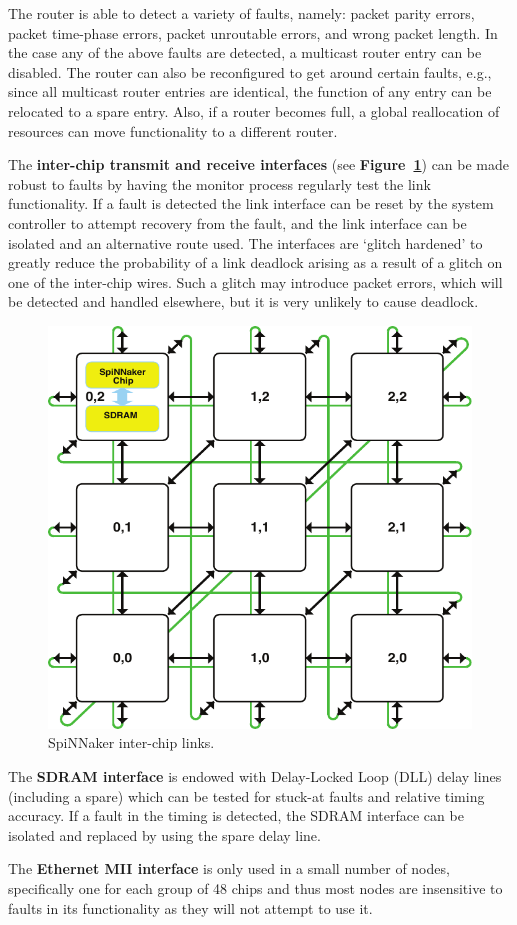 \documentclass[oneside, a4paper, 11pt]{memoir}
\begin{document}
The router is able to detect a variety of faults, namely: packet parity errors, packet time-phase errors, packet unroutable errors, and wrong packet length. In the case any of the above faults are detected, a multicast router entry can be disabled. The router can also be reconfigured to get around certain faults, e.g., since all multicast router entries are identical, the function of any entry can be relocated to a spare entry. Also, if a router becomes full, a global reallocation of resources can move functionality to a different router.

The \textbf{inter-chip transmit and receive interfaces} (see \textbf{Figure~\ref{fig:interchip_links}}) can be made robust to faults by having the monitor process regularly test the link functionality. If a fault is detected the link interface can be reset by the system controller to attempt recovery from the fault, and the link interface can be isolated and an alternative route used. The interfaces are `glitch hardened' to greatly reduce the probability of a link deadlock arising as a result of a glitch on one of the inter-chip wires. Such a glitch may introduce packet errors, which will be detected and handled elsewhere, but it is very unlikely to cause deadlock.

\begin{figure}[b]
	\centering
	\includegraphics[width=0.35\linewidth]{images/system_architecture.pdf}
	\caption{SpiNNaker inter-chip links.}
	\label{fig:interchip_links}	
\end{figure}

The \textbf{SDRAM interface} is endowed with Delay-Locked Loop (DLL) delay lines (including a spare) which can be tested for stuck-at faults and relative timing accuracy. If a fault in the timing is detected, the SDRAM interface can be isolated and replaced by using the spare delay line.

The \textbf{Ethernet MII interface} is only used in a small number of nodes, specifically one for each group of 48 chips and thus most nodes are insensitive to faults in its functionality as they will not attempt to use it.
\end{document}
